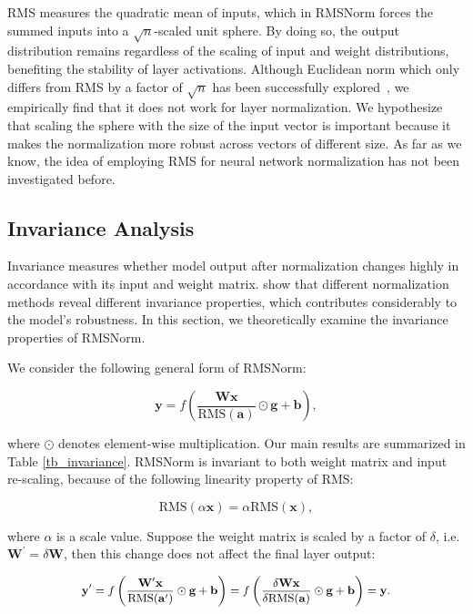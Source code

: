 RMS measures the quadratic mean of inputs, which in RMSNorm forces the summed inputs into a $\sqrt{n}$-scaled unit sphere. By doing so, the output distribution remains regardless of the scaling of input and weight distributions, benefiting the stability of layer activations. Although Euclidean norm which only differs from RMS by a factor of $\sqrt{n}$ has been successfully explored~\cite{NIPS2016_6114}, we empirically find that it does not work for layer normalization. We hypothesize that scaling the sphere with the size of the input vector is important because it makes the normalization more robust across vectors of different size. As far as we know, the idea of employing RMS for neural network normalization has not been investigated before.

\subsection{Invariance Analysis}

Invariance measures whether model output after normalization changes highly in accordance with its input and weight matrix. \citet{ba2016layer} show that different normalization methods reveal different invariance properties, which contributes considerably to the model's robustness. In this section, we theoretically examine the invariance properties of RMSNorm. 

We consider the following general form of RMSNorm:

\begin{equation}
    \mathbf{y} = f\left(\frac{\mathbf{Wx}}{\text{RMS}(\mathbf{a})} \odot \mathbf{g} + \mathbf{b}\right),
\end{equation}

where $\odot$ denotes element-wise multiplication. Our main results are summarized in Table \ref{tb_invariance}. RMSNorm is invariant to both weight matrix and input re-scaling, because of the following linearity property of RMS:

\begin{equation}\label{eq_linear_rms}
    \text{RMS}(\alpha\mathbf{x}) = \alpha \text{RMS}(\mathbf{x}), 
\end{equation}

where $\alpha$ is a scale value. Suppose the weight matrix is scaled by a factor of $\delta$, i.e. $\mathbf{W}^\prime = \delta\mathbf{W}$, then this change does not affect the final layer output:

\begin{equation}\label{eq_scale_weight}
    \small
    \begin{split}
        \mathbf{y}^\prime = f\left(\frac{\mathbf{W^{\prime}x}}{\text{RMS}(\mathbf{a}^\prime)} \odot \mathbf{g} + \mathbf{b}\right) = f\left(\frac{\delta\mathbf{Wx}}{\delta\text{RMS}(\mathbf{a})} \odot \mathbf{g} + \mathbf{b}\right) = \mathbf{y}.

    \end{split}
\end{equation}

